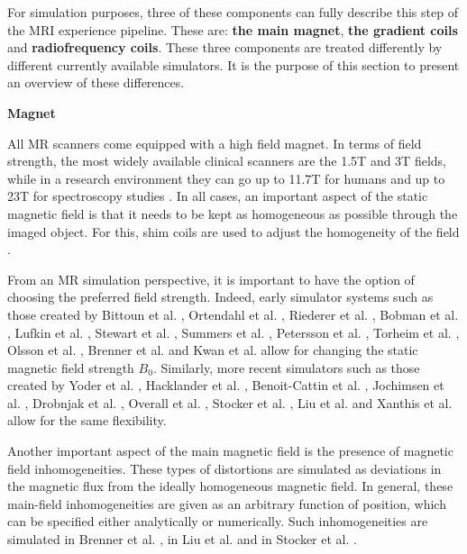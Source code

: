 \hfill

For simulation purposes, three of these components can fully describe this step of the MRI experience pipeline.
These are: \textbf{the main magnet}, \textbf{the gradient coils} and \textbf{radiofrequency coils}.
These three components are treated differently by different currently available simulators.
It is the purpose of this section to present an overview of these differences.

\hfill

\large \textbf{Magnet} \normalsize

All MR scanners come equipped with a high field magnet.
In terms of field strength, the most widely available clinical scanners are the 1.5T and 3T fields, while in a research environment they can go up to 11.7T for humans and up to 23T for spectroscopy studies \cite{Morrow2000}.
In all cases, an important aspect of the static magnetic field is that it needs to be kept as homogeneous as possible through the imaged object.
For this, shim coils are used to adjust the homogeneity of the field \cite{Romeo1984}.

\hfill

From an MR simulation perspective, it is important to have the option of choosing the preferred field strength.
Indeed, early simulator systems such as those created by
Bittoun et al. \cite{Bittoun1984},
Ortendahl et al. \cite{Ortendahl1984},
Riederer et al. \cite{Riederer1984},
Bobman et al. \cite{Bobman1985},
Lufkin et al. \cite{Lufkin1986},
Stewart et al. \cite{Stewart1986},
Summers et al. \cite{Summers1986},
Petersson et al. \cite{Petersson1993},
Torheim et al. \cite{Torheim1994}, 
Olsson et al. \cite{Olsson1995},
Brenner et al. \cite{Brenner1997} and
Kwan et al. \cite{Kwan1997} allow for changing the static magnetic field strength $B_0$.
Similarly, more recent simulators such as those created by
Yoder et al. \cite{Yoder2004},
Hacklander et al. \cite{Hacklander2005},
Benoit-Cattin et al. \cite{Benoit-Cattin2005},
Jochimsen et al. \cite{Jochimsen2004},
Drobnjak et al. \cite{Drobnjak2006},
Overall et al. \cite{Overall2007},
Stocker et al. \cite{Stocker2010},
Liu et al. \cite{Liu2013} and 
Xanthis et al. \cite{Xanthis2014} allow for the same flexibility.

\hfill

Another important aspect of the main magnetic field is the presence of magnetic field inhomogeneities.
These types of distortions are simulated as deviations in the magnetic flux from the ideally homogeneous magnetic field.
In general, these main-field inhomogeneities are given as an arbitrary function of position, which can be specified either analytically or numerically.
Such inhomogeneities are simulated in 
Brenner et al. \cite{Brenner1997}, in
Liu et al. \cite{Liu2013} and in
Stocker et al. \cite{Stocker2010}.

